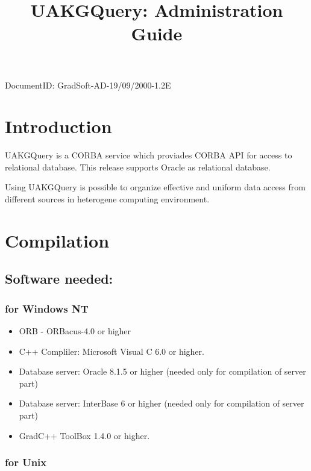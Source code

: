 \documentclass[10pt]{article}
\title{ UAKGQuery: Administration Guide }
\begin{document}
\maketitle{}
DocumentID: GradSoft-AD-19/09/2000-1.2E

\tableofcontents

\section{ Introduction }

UAKGQuery is a  CORBA service which proviades CORBA API for  access to relational database.
 This release supports Oracle as relational database.

 Using UAKGQuery is possible to organize effective and uniform data access
from different sources in heterogene computing environment.

\section{ Compilation }

\subsection{ Software needed: }
 
\subsubsection{ for Windows NT }

\begin{itemize}
 \item ORB - ORBacus-4.0 or higher
 \item C++ Compliler: Microsoft Visual C 6.0 or higher. 
 \item Database server: Oracle 8.1.5  or higher (needed only for compilation of server part)
 \item Database server: InterBase 6 or higher (needed only for compilation of server part)
 \item GradC++ ToolBox 1.4.0 or higher.
\end{itemize}


\subsubsection{ for Unix }
\end{document}
